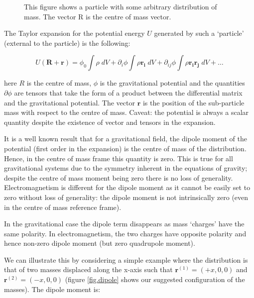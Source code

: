 \begin{figure}[htb]
   \begin{center}
     \leavevmode
                \epsfxsize=80mm

   \end{center}
\caption{This figure shows a particle with some arbitrary distribution of mass. The vector R is the centre of mass vector.}
\label{fig.jackson}
\end{figure} 

\noindent The Taylor expansion for the potential energy $U$ generated by such a `particle' (external to the particle) is the following:

\begin{equation}
\label{taylor}
U (\mathbf{R} + \mathbf{r}) = \phi_0 \int \rho\;dV + \partial_i \phi \int \rho \mathbf{r_i}\;dV + \partial_{ij} \phi \int \rho \mathbf{r_i} \mathbf{r_j}\;dV + \ldots
\end{equation}

\noindent here $R$ is the centre of mass, $\phi$ is the gravitational potential and the quantities $\partial \phi$ are tensors that take the form of a product between the differential matrix and the gravitational potential. The vector $\mathbf{r}$ is the position of the sub-particle mass with respect to the centre of mass. Caveat: the potential is always a scalar quantity despite the existence of vector and tensors in the expansion.

It is a well known result that for a gravitational field, the dipole moment of the potential (first order in the expansion) is the centre of mass 
of the distribution. Hence, in the centre of mass frame this quantity is zero. This is true for all gravitational systems due to the symmetry inherent in the equations of gravity; despite the centre of mass moment being zero there is no loss of generality. Electromagnetism is different for the dipole moment as it cannot be easily set to zero without loss of generality: the dipole moment is not intrinsically zero (even in the centre of mass reference frame).

In the gravitational case the dipole term disappears as mass `charges' have the same polarity. In electromagnetism, the two charges have opposite polarity and hence non-zero dipole moment (but zero quadrupole moment).

We can illustrate this by considering a simple example where the distribution is that of two masses displaced along the x-axis such that $\mathbf{r}^{(1)} = (+x,0,0)$ and $\mathbf{r}^{(2)} = (-x,0,0)$ (figure \ref{fig.dipole} shows our suggested configuration of the masses). The dipole moment is:

